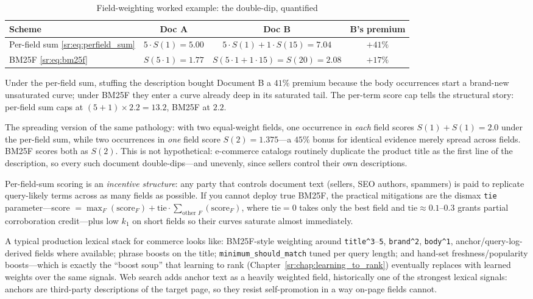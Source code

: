 \begin{table}[H]
\centering
\caption{Field-weighting worked example: the double-dip, quantified}
\label{sr:tab:bm25f_worked}
\small
\begin{tabular}{lccc}
\toprule
\textbf{Scheme} & \textbf{Doc A} & \textbf{Doc B} & \textbf{B's premium} \\
\midrule
Per-field sum \eqref{sr:eq:perfield_sum} & $5 \cdot S(1) = 5.00$ & $5 \cdot S(1) + 1 \cdot S(15) = 7.04$ & $+41\%$ \\
BM25F \eqref{sr:eq:bm25f} & $S(5 \cdot 1) = 1.77$ & $S(5 \cdot 1 + 1 \cdot 15) = S(20) = 2.08$ & $+17\%$ \\
\bottomrule
\end{tabular}
\end{table}

Under the per-field sum, stuffing the description bought Document B a $41\%$ premium because the body occurrences start a brand-new unsaturated curve; under BM25F they enter a curve already deep in its saturated tail. The per-term score cap tells the structural story: per-field sum caps at $(5+1)\times 2.2 = 13.2$, BM25F at $2.2$.

The spreading version of the same pathology: with two equal-weight fields, one occurrence in \emph{each} field scores $S(1) + S(1) = 2.0$ under the per-field sum, while two occurrences in \emph{one} field score $S(2) = 1.375$---a $45\%$ bonus for identical evidence merely spread across fields. BM25F scores both as $S(2)$. This is not hypothetical: e-commerce catalogs routinely duplicate the product title as the first line of the description, so every such document double-dips---and unevenly, since sellers control their own descriptions.

\begin{warningbox}
Per-field-sum scoring is an \emph{incentive structure}: any party that controls document text (sellers, SEO authors, spammers) is paid to replicate query-likely terms across as many fields as possible. If you cannot deploy true BM25F, the practical mitigations are the dismax \texttt{tie} parameter---score $= \max_F(\text{score}_F) + \text{tie} \cdot \sum_{\text{other } F}(\text{score}_F)$, where $\text{tie}=0$ takes only the best field and $\text{tie}\approx 0.1$--$0.3$ grants partial corroboration credit---plus low $k_1$ on short fields so their curves saturate almost immediately.
\end{warningbox}

A typical production lexical stack for commerce looks like: BM25F-style weighting around \texttt{title\^{}3}--\texttt{5}, \texttt{brand\^{}2}, \texttt{body\^{}1}, anchor/query-log-derived fields where available; phrase boosts on the title; \texttt{minimum\_should\_match} tuned per query length; and hand-set freshness/popularity boosts---which is exactly the ``boost soup'' that learning to rank (Chapter~\ref{sr:chap:learning_to_rank}) eventually replaces with learned weights over the same signals. Web search adds anchor text as a heavily weighted field, historically one of the strongest lexical signals: anchors are third-party descriptions of the target page, so they resist self-promotion in a way on-page fields cannot.

